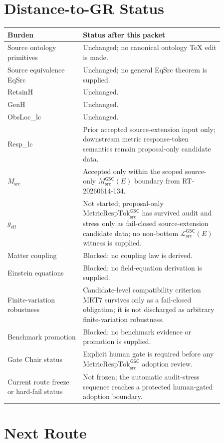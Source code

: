\documentclass[11pt]{article}
\newcommand{\Msrc}{M_{\mathrm{src}}}
\newcommand{\MsrcGSC}{M_{\mathrm{src}}^{\mathsf{GSC}}}
\newcommand{\MetricRespTok}{\mathrm{MetricRespTok}_{\mathrm{src}}^{\mathsf{GSC}}}
\newcommand{\MetricData}{\mathcal{L}_{\mathrm{src}}^{\mathsf{GSC}}}
\newcommand{\geff}{g_{\mathrm{eff}}}
\begin{document}
\section{Distance-to-GR Status}

\begin{longtable}{p{0.30\linewidth}p{0.56\linewidth}}
\toprule
Burden & Status after this packet \\
\midrule
Source ontology primitives & Unchanged; no canonical ontology TeX edit is made. \\
Source equivalence EqSrc & Unchanged; no general EqSrc theorem is supplied. \\
RetainH & Unchanged. \\
GenH & Unchanged. \\
ObsLoc\_lc & Unchanged. \\
Resp\_lc & Prior accepted source-extension input only; downstream metric response-token semantics remain proposal-only candidate data. \\
\(\Msrc\) & Accepted only within the scoped source-only \(\MsrcGSC(E)\) boundary from RT-20260614-134. \\
\(\geff\) & Not started; proposal-only \(\MetricRespTok\) has survived audit and stress only as fail-closed source-extension candidate data; no non-bottom \(\MetricData(E)\) witness is supplied. \\
Matter coupling & Blocked; no coupling law is derived. \\
Einstein equations & Blocked; no field-equation derivation is supplied. \\
Finite-variation robustness & Candidate-level compatibility criterion MRT7 survives only as a fail-closed obligation; it is not discharged as arbitrary finite-variation robustness. \\
Benchmark promotion & Blocked; no benchmark evidence or promotion is supplied. \\
Gate Chair status & Explicit human gate is required before any \(\MetricRespTok\) adoption review. \\
Current route freeze or hard-fail status & Not frozen; the automatic audit-stress sequence reaches a protected human-gated adoption boundary. \\
\bottomrule
\end{longtable}

\section{Next Route}
\end{document}
